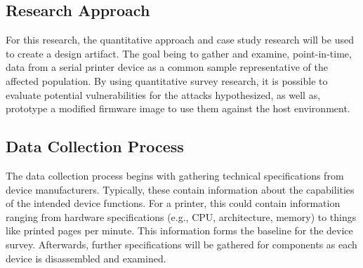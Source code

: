 \subsection{Research Approach} \label{researchapproach}

For this research, the quantitative approach and case study research will be used \autocite{babbie2017basics,creswell2017research} to create a design artifact. The goal being to gather and examine, point-in-time, data from a serial printer device as a common sample representative of the affected population. By using quantitative survey research, it is possible to evaluate potential vulnerabilities for the attacks hypothesized, as well as, prototype a modified firmware image to use them against the host environment.




\subsection{Data Collection Process} \label{datacollectionprocess}

The data collection process begins with gathering technical specifications from device manufacturers. Typically, these contain information about the capabilities of the intended device functions. For a printer, this could contain information ranging from hardware specifications (e.g., CPU, architecture, memory) to things like printed pages per minute. This information forms the baseline for the device survey. Afterwards, further specifications will be gathered for components as each device is disassembled and examined.



